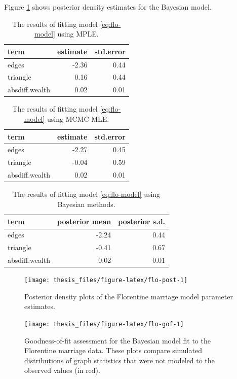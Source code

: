\documentclass[12pt,twoside]{reedthesis}
\theoremstyle{definition}
\theoremstyle{definition}
\theoremstyle{remark}
\begin{document}
Figure \ref{fig:flo-post} shows posterior density estimates for the
Bayesian model.
\begin{table}

\caption{\label{tab:flo-models-mple}The results of fitting model \ref{eq:flo-model} using MPLE.}
\centering
\begin{tabular}[t]{lrr}
\toprule
term & estimate & std.error\\
\midrule
edges & -2.36 & 0.44\\
triangle & 0.16 & 0.44\\
absdiff.wealth & 0.02 & 0.01\\
\bottomrule
\end{tabular}
\end{table}
\begin{table}

\caption{\label{tab:flo-models-mcmc}The results of fitting model \ref{eq:flo-model} using MCMC-MLE.}
\centering
\begin{tabular}[t]{lrr}
\toprule
term & estimate & std.error\\
\midrule
edges & -2.27 & 0.45\\
triangle & -0.04 & 0.59\\
absdiff.wealth & 0.02 & 0.01\\
\bottomrule
\end{tabular}
\end{table}
\begin{table}

\caption{\label{tab:flo-models-bayes}The results of fitting model \ref{eq:flo-model} using Bayesian methods.}
\centering
\begin{tabular}[t]{lrr}
\toprule
term & posterior mean & posterior s.d.\\
\midrule
edges & -2.24 & 0.44\\
triangle & -0.41 & 0.67\\
absdiff.wealth & 0.02 & 0.01\\
\bottomrule
\end{tabular}
\end{table}
\begin{figure}

{\centering \texttt{[image: thesis\_files/figure-latex/flo-post-1]} 

}

\caption{Posterior density plots of the Florentine marriage model parameter estimates.}\label{fig:flo-post}
\end{figure}
\begin{figure}

{\centering \texttt{[image: thesis\_files/figure-latex/flo-gof-1]} 

}

\caption{Goodness-of-fit assessment for the Bayesian model fit to the Florentine marriage data. These plots compare simulated distributions of graph statistics that were not modeled to the observed values (in red).}\label{fig:flo-gof}
\end{figure}
\end{document}
